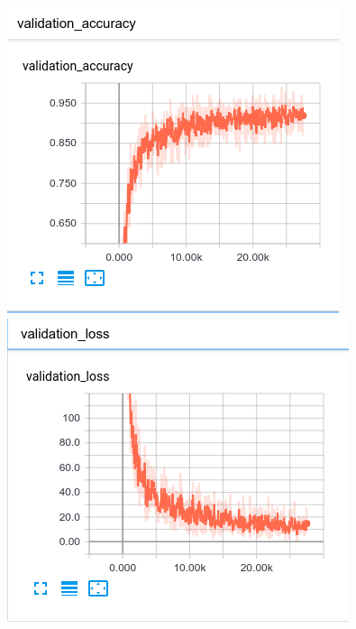 \begin{figure}[h]
\centering
\begin{minipage}{.5\textwidth}
  \centering
  \includegraphics[width=.99\linewidth]{3.png}
\end{minipage}%
\begin{minipage}{.5\textwidth}
  \centering
  \includegraphics[width=.99\linewidth]{4.png}
\end{minipage}
\end{figure}
    

